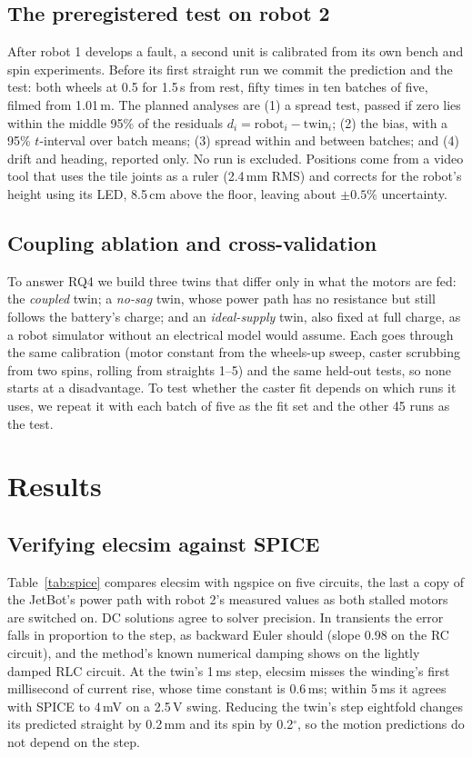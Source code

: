 \documentclass[conference,a4paper]{IEEEtran}
\begin{document}
\subsection{The preregistered test on robot 2}
After robot 1 develops a fault, a second unit is calibrated from its own bench
and spin experiments. Before its first straight run we commit the prediction
and the test: both wheels at 0.5 for 1.5\,s from rest, fifty times in ten
batches of five, filmed from 1.01\,m. The planned analyses are (1) a spread
test, passed if zero lies within the middle 95\% of the residuals
$d_i = \text{robot}_i - \text{twin}_i$; (2) the bias, with a 95\%
$t$-interval over batch means; (3) spread within and between batches; and
(4) drift and heading, reported only. No run is excluded. Positions come from
a video tool that uses the tile joints as a ruler (2.4\,mm RMS) and corrects
for the robot's height using its LED, 8.5\,cm above the floor, leaving about
$\pm0.5\%$ uncertainty.

\subsection{Coupling ablation and cross-validation}
To answer RQ4 we build three twins that differ only in what the motors are
fed: the \emph{coupled} twin; a \emph{no-sag} twin, whose power path has no
resistance but still follows the battery's charge; and an \emph{ideal-supply}
twin, also fixed at full charge, as a robot simulator without an electrical
model would assume. Each goes through the same calibration (motor constant
from the wheels-up sweep, caster scrubbing from two spins, rolling from
straights 1--5) and the same held-out tests, so none starts at a disadvantage.
To test whether the caster fit depends on which runs it uses, we repeat it
with each batch of five as the fit set and the other 45 runs as the test.

\section{Results}\label{sec:results}

\subsection{Verifying elecsim against SPICE}
Table~\ref{tab:spice} compares elecsim with ngspice on five circuits, the
last a copy of the JetBot's power path with robot 2's measured values as both
stalled motors are switched on. DC solutions agree to solver precision. In
transients the error falls in proportion to the step, as backward Euler
should (slope 0.98 on the RC circuit), and the method's known numerical
damping shows on the lightly damped RLC circuit. At the twin's 1\,ms step,
elecsim misses the winding's first millisecond of current rise, whose time
constant is 0.6\,ms; within 5\,ms it agrees with SPICE to 4\,mV on a 2.5\,V
swing. Reducing the twin's step eightfold changes its predicted straight by
0.2\,mm and its spin by 0.2$^\circ$, so the motion predictions do not depend
on the step.
\end{document}
